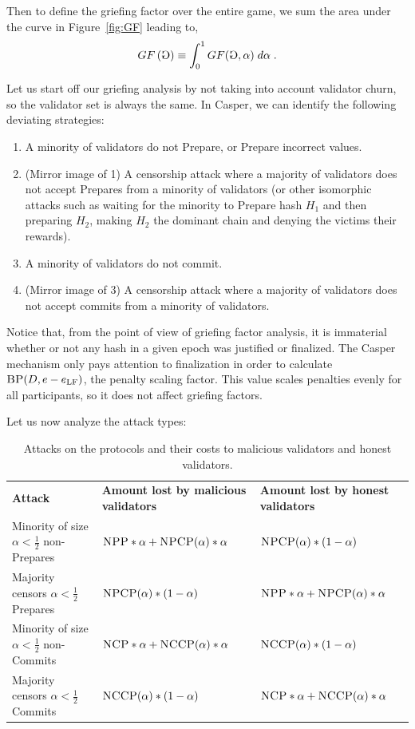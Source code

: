 \documentclass[12pt, final]{article}
\newcommand{\figref}[1]{Figure~\ref{#1}}
\newcommand{\epoch}{\ensuremath{e}\space}
\newcommand{\gamesymbol}{\reflectbox{G}}
\newcommand{\epochLF}{\ensuremath{\epoch_{\textnormal{LF}}}\space}
\newcommand{\GF}[1]{GF\left( #1 \right)\space}
\newcommand{\BP}{\textsc{BP}\space}
\newcommand{\NCP}{\textsc{NCP}\space}
\newcommand{\NCCP}{\textsc{NCCP}\space}
\newcommand{\NPP}{\textsc{NPP}\space}
\newcommand{\NPCP}{\textsc{NPCP}\space}
\begin{document}
Then to define the griefing factor over the entire game, we sum the area under the curve in \figref{fig:GF} leading to,
\begin{equation}
\GF{ \gamesymbol } \equiv \int_{0}^{1} GF( \gamesymbol, \alpha ) \; d\alpha \; .
\end{equation}


Let us start off our griefing analysis by not taking into account validator churn, so the validator set is always the same. In Casper, we can identify the following deviating strategies:

\begin{enumerate}
\item A minority of validators do not Prepare, or Prepare incorrect values.
\item (Mirror image of 1) A censorship attack where a majority of validators does not accept Prepares from a minority of validators (or other isomorphic attacks such as waiting for the minority to Prepare hash $H_1$ and then preparing $H_2$, making $H_2$ the dominant chain and denying the victims their rewards).
\item A minority of validators do not commit.
\item (Mirror image of 3) A censorship attack where a majority of validators does not accept commits from a minority of validators.
\end{enumerate}

Notice that, from the point of view of griefing factor analysis, it is immaterial whether or not any hash in a given epoch was justified or finalized. The Casper mechanism only pays attention to finalization in order to calculate $\BP(D, \epoch - \epochLF)$, the penalty scaling factor. This value scales penalties evenly for all participants, so it does not affect griefing factors.

Let us now analyze the attack types:



\begin{table}
\centering
    \renewcommand{\arraystretch}{2}
    \begin{tabular}{l l l }
    \textbf{Attack} & \textbf{Amount lost by malicious validators}  & \textbf{Amount lost by honest validators} \\
    Minority of size $\alpha < \frac{1}{2}$ non-Prepares & $\NPP * \alpha + \NPCP(\alpha) * \alpha$ & $\NPCP(\alpha) * (1-\alpha)$ \\
    Majority censors $\alpha < \frac{1}{2}$ Prepares & $\NPCP(\alpha) * (1-\alpha)$ & $\NPP * \alpha + \NPCP(\alpha) * \alpha$ \\
    Minority of size $\alpha < \frac{1}{2}$ non-Commits & $\NCP * \alpha + \NCCP(\alpha) * \alpha$ & $\NCCP(\alpha) * (1-\alpha)$ \\
    Majority censors $\alpha < \frac{1}{2}$ Commits & $\NCCP(\alpha) * (1-\alpha)$ & $\NCP * \alpha + \NCCP(\alpha) * \alpha$ \\
    \end{tabular}
    \caption{Attacks on the protocols and their costs to malicious validators and honest validators.}
\end{table}
\end{document}
